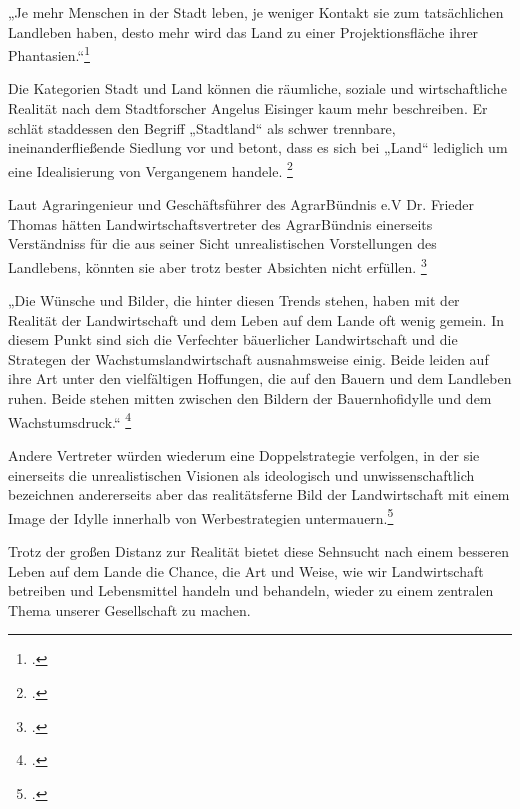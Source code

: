 \documentclass{scrartcl}
\begin{document}
\begin{displayquote}
„Je mehr Menschen in der Stadt leben, je weniger Kontakt sie zum tatsächlichen Landleben haben, desto mehr wird das Land zu einer Projektionsfläche ihrer Phantasien.“\footcite[S. 8]{Dr.ThomasPetersen2014DieLandlichkeit}
\end{displayquote}

Die Kategorien Stadt und Land können die räumliche, soziale und wirtschaftliche Realität nach dem Stadtforscher Angelus Eisinger kaum mehr beschreiben. Er schlät staddessen den Begriff „Stadtland“ als schwer trennbare, ineinanderfließende Siedlung vor und betont, dass es sich bei „Land“ lediglich um eine Idealisierung von Vergangenem handele. \footcite[Vgl.][S. 40]{Egnolff2015DieIdeal}

Laut Agraringenieur und Geschäftsführer des AgrarBündnis e.V Dr. Frieder Thomas hätten Landwirtschaftsvertreter des AgrarBündnis einerseits Verständniss für die aus seiner Sicht unrealistischen Vorstellungen des Landlebens, könnten sie aber trotz bester Absichten nicht erfüllen. \footcite[Vgl.][S. 27]{Thomas2015BauerlichkeitBegriff}

\begin{displayquote}
„Die Wünsche und Bilder, die hinter diesen Trends stehen, haben mit der Realität der Landwirtschaft und dem Leben auf dem Lande oft wenig gemein. In diesem Punkt sind sich die Verfechter bäuerlicher Landwirtschaft und die Strategen der Wachstumslandwirtschaft ausnahmsweise einig. Beide leiden auf ihre Art unter den vielfältigen Hoffungen, die auf den Bauern und dem Landleben ruhen. Beide stehen mitten zwischen den Bildern der Bauernhofidylle und dem Wachstumsdruck.“ \footcite[S. 27]{Dr.Thomas2015BauerlichkeitBegriff}
\end{displayquote}

Andere Vertreter würden wiederum eine Doppelstrategie verfolgen, in der sie einerseits die unrealistischen Visionen als ideologisch und unwissenschaftlich bezeichnen andererseits aber das realitätsferne Bild der Landwirtschaft mit einem Image der Idylle innerhalb von Werbestrategien untermauern.\footcite[S. 27f]{Dr.Thomas2015BauerlichkeitBegriff}

Trotz der großen Distanz zur Realität bietet diese Sehnsucht nach einem besseren Leben auf dem Lande die Chance, die Art und Weise, wie wir Landwirtschaft betreiben und Lebensmittel handeln und behandeln, wieder zu einem zentralen Thema unserer Gesellschaft zu machen.
\end{document}
